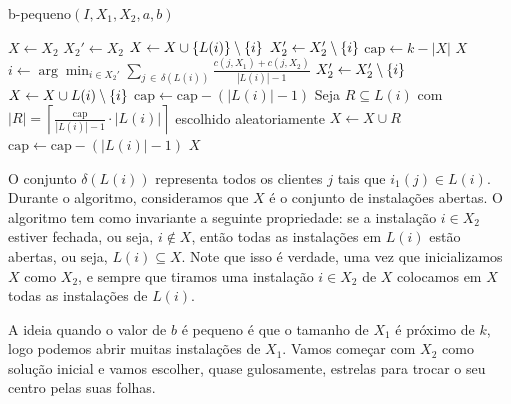 \begin{algorithm}[H]
    \caption{\sc b-pequeno$(I,X_1,X_2,a,b)$}
    \begin{algorithmic}[1]
        \State $X \gets X_2$
        \State $X_2' \gets X_2$
            \State $X \gets X \cup \{L(i)\} \setminus \{i\}$
            \State $X_2' \gets X_2'\setminus \{i\}$
        \EndFor
        \State $\text{cap} \gets k - |X|$
                \State \Return $X$
            \EndIf
            \State $i \gets \arg\min_{i \in X_2'}\sum_{ j \, \in \, \delta(L(i))} \frac{ c(j,X_1) + c(j,X_2)} {|L(i)| - 1}$
            \State $X_2' \gets X_2' \setminus \{i\}$
                \State $X \gets X \cup L(i) \setminus \{i\}$
                \State $\text{cap}\gets \text{cap}  - (|L(i)| - 1)$
            \Else
                \State Seja $R \subseteq L(i)$ com $|R| = \left\lceil \frac{\text{cap}}{|L(i)| - 1} \cdot |L(i)| \right\rceil$ escolhido aleatoriamente
                \State $X \gets X \cup R$
                \State $\text{cap} \gets \text{cap} - (|L(i)| - 1)$
            \EndIf
        \EndWhile
        \State \Return $X$
    \end{algorithmic}
\end{algorithm}
O conjunto $\delta(L(i))$ representa todos os clientes $j$ tais que $i_1(j) \in L(i)$. Durante o algoritmo, consideramos que $X$ é o conjunto de instalações abertas. O algoritmo tem como invariante a seguinte propriedade: se a instalação $i \in X_2$ estiver fechada, ou seja, $i \not \in X$, então todas as instalações em $L(i)$ estão abertas, ou seja, $L(i) \subseteq X$. Note que isso é verdade, uma vez que inicializamos $X$ como $X_2$, e sempre que tiramos uma instalação $i \in X_2$ de $X$ colocamos em $X$ todas as instalações de $L(i)$.

A ideia quando o valor de $b$ é pequeno é que o tamanho de $X_1$ é próximo de $k$, logo podemos abrir muitas instalações de $X_1$. 
Vamos começar com $X_2$ como solução inicial e vamos escolher, quase gulosamente, estrelas para trocar o seu centro pelas suas folhas.

